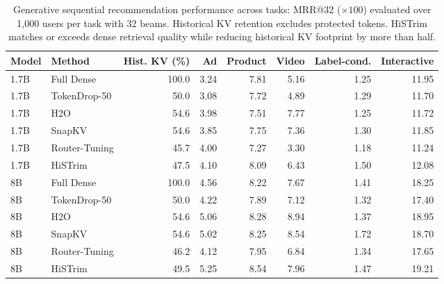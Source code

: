 \begin{table}[t]
\centering\small
\begin{tabular}{llrrrrrr}
\toprule
Model & Method & Hist. KV (\%) & Ad & Product & Video & Label-cond. & Interactive \\
\midrule
1.7B & Full Dense & 100.0 & 3.24 & 7.81 & 5.16 & 1.25 & 11.95 \\
1.7B & TokenDrop-50 & 50.0 & 3.08 & 7.72 & 4.89 & 1.29 & 11.70 \\
1.7B & H2O & 54.6 & 3.98 & 7.51 & 7.77 & 1.25 & 11.72 \\
1.7B & SnapKV & 54.6 & 3.85 & 7.75 & 7.36 & 1.30 & 11.85 \\
1.7B & Router-Tuning & 45.7 & 4.00 & 7.27 & 3.30 & 1.18 & 11.24 \\
1.7B & HiSTrim & 47.5 & 4.10 & 8.09 & 6.43 & 1.50 & 12.08 \\
\midrule
8B & Full Dense & 100.0 & 4.56 & 8.22 & 7.67 & 1.41 & 18.25 \\
8B & TokenDrop-50 & 50.0 & 4.22 & 7.89 & 7.12 & 1.32 & 17.40 \\
8B & H2O & 54.6 & 5.06 & 8.28 & 8.94 & 1.37 & 18.95 \\
8B & SnapKV & 54.6 & 5.02 & 8.25 & 8.54 & 1.72 & 18.70 \\
8B & Router-Tuning & 46.2 & 4.12 & 7.95 & 6.84 & 1.34 & 17.65 \\
8B & HiSTrim & 49.5 & 5.25 & 8.54 & 7.96 & 1.47 & 19.21 \\
\bottomrule
\end{tabular}
\caption{Generative sequential recommendation performance across tasks: MRR@32 ($\times 100$) evaluated over 1,000 users per task with 32 beams. Historical KV retention excludes protected tokens. HiSTrim matches or exceeds dense retrieval quality while reducing historical KV footprint by more than half.}
\label{tab:histrim_source_mrr}
\end{table}
